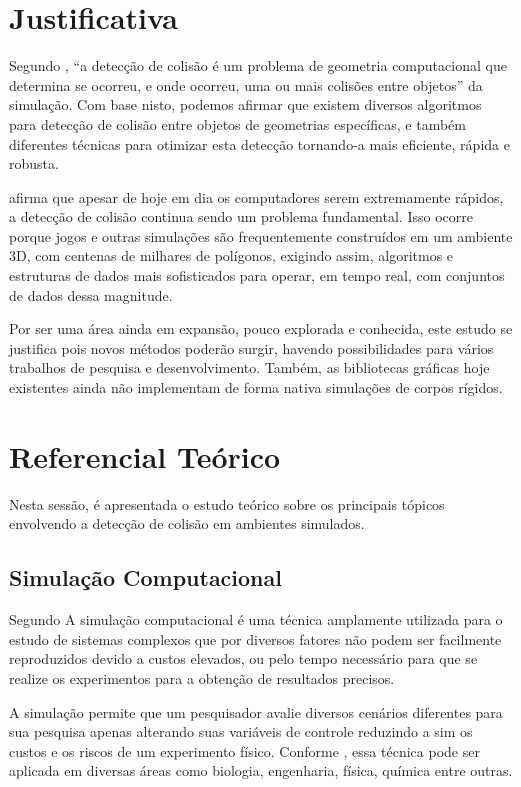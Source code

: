 \section{Justificativa}

Segundo , “a detecção de colisão é um problema de geometria computacional que determina se ocorreu, e onde ocorreu, uma ou mais colisões entre objetos” da simulação. Com base nisto, podemos afirmar que existem diversos algoritmos para detecção de colisão entre objetos de geometrias específicas, e também diferentes técnicas para otimizar esta detecção tornando-a mais eficiente, rápida e robusta.

 afirma que apesar de hoje em dia os computadores serem extremamente rápidos, a detecção de colisão continua sendo um problema fundamental. Isso ocorre porque jogos e outras simulações são frequentemente construídos em um ambiente 3D, com centenas de milhares de polígonos, exigindo assim, algoritmos e estruturas de dados mais sofisticados para operar, em tempo real, com conjuntos de dados dessa magnitude.

Por ser uma área ainda em expansão, pouco explorada e conhecida, este estudo se justifica pois novos métodos poderão surgir, havendo possibilidades para vários trabalhos de pesquisa e desenvolvimento. Também, as bibliotecas gráficas hoje existentes ainda não implementam de forma nativa simulações de corpos rígidos.

\section{Referencial Teórico}

Nesta sessão, é apresentada o estudo teórico sobre os principais tópicos envolvendo a detecção de colisão em ambientes simulados.

\subsection{Simulação Computacional}

Segundo  A simulação computacional é uma técnica amplamente utilizada para o estudo de
sistemas complexos que por diversos fatores não podem ser facilmente
reproduzidos devido a custos elevados, ou pelo tempo necessário para que se
realize os experimentos para a obtenção de resultados precisos.

A simulação permite que um pesquisador avalie diversos cenários diferentes para sua
pesquisa apenas alterando suas variáveis de controle reduzindo a sim os custos
e os riscos de um experimento físico. Conforme , essa técnica pode ser aplicada em
diversas áreas como biologia, engenharia, física, química entre outras.

